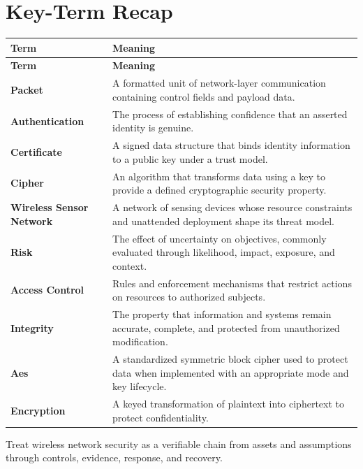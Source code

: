 \documentclass[11pt]{article}
\begin{document}
\section*{Key-Term Recap}
\begin{longtable}{>{\RaggedRight\arraybackslash}p{}>{\RaggedRight\arraybackslash}p{}}
\toprule\rowcolor{Navy}\color{white}\textbf{Term} & \color{white}\textbf{Meaning}\\\midrule
\endfirsthead
\toprule\rowcolor{Navy}\color{white}\textbf{Term} & \color{white}\textbf{Meaning}\\\midrule
\endhead
\textbf{Packet} & A formatted unit of network-layer communication containing control fields and payload data. \\\midrule
\textbf{Authentication} & The process of establishing confidence that an asserted identity is genuine. \\\midrule
\textbf{Certificate} & A signed data structure that binds identity information to a public key under a trust model. \\\midrule
\textbf{Cipher} & An algorithm that transforms data using a key to provide a defined cryptographic security property. \\\midrule
\textbf{Wireless Sensor Network} & A network of sensing devices whose resource constraints and unattended deployment shape its threat model. \\\midrule
\textbf{Risk} & The effect of uncertainty on objectives, commonly evaluated through likelihood, impact, exposure, and context. \\\midrule
\textbf{Access Control} & Rules and enforcement mechanisms that restrict actions on resources to authorized subjects. \\\midrule
\textbf{Integrity} & The property that information and systems remain accurate, complete, and protected from unauthorized modification. \\\midrule
\textbf{Aes} & A standardized symmetric block cipher used to protect data when implemented with an appropriate mode and key lifecycle. \\\midrule
\textbf{Encryption} & A keyed transformation of plaintext into ciphertext to protect confidentiality. \\\midrule
\bottomrule
\end{longtable}
\begin{takeawaybox}
Treat wireless network security as a verifiable chain from assets and assumptions through controls, evidence, response, and recovery.
\end{takeawaybox}
\end{document}
